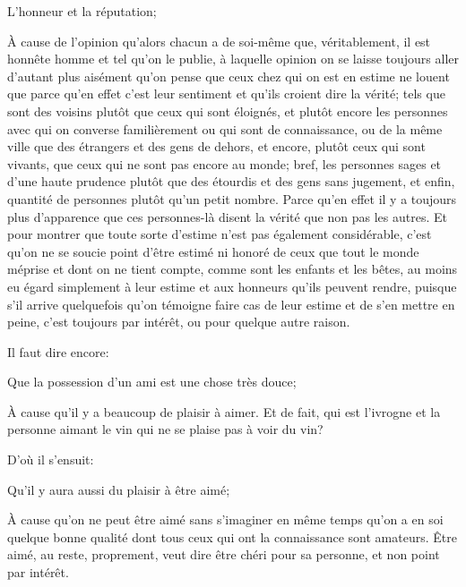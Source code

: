 \begin{lieu}
	L'honneur et la réputation;
\end{lieu}

À cause de l'opinion qu'alors chacun a de soi-même que, véritablement, il est honnête homme et tel qu'on le
publie, à laquelle opinion on se laisse toujours aller d'autant plus aisément qu'on pense que ceux chez qui
on est en estime ne louent que parce qu'en effet c'est leur sentiment et qu'ils croient dire la vérité; tels
que sont des voisins plutôt que ceux qui sont éloignés, et plutôt encore les personnes avec qui on converse
familièrement ou qui sont de connaissance, ou de la même ville que des étrangers et des gens de dehors, et
encore, plutôt ceux qui sont vivants, que ceux qui ne sont pas encore au monde; bref, les personnes sages et
d'une haute prudence plutôt que des étourdis et des gens sans jugement, et enfin, quantité de personnes
plutôt qu'un petit nombre. Parce qu'en effet il y a toujours plus d'apparence que ces personnes-là disent la
vérité que non pas les autres. Et pour montrer que toute sorte d'estime n'est pas également considérable, c'est
qu'on ne se soucie point d'être estimé ni honoré de ceux que tout le monde méprise et dont on ne tient compte,
comme sont les enfants et les bêtes, au moins eu égard simplement à leur estime et aux honneurs qu'ils peuvent
rendre, puisque s'il arrive quelquefois qu'on témoigne faire cas de leur estime et de s'en mettre en peine,
c'est toujours par intérêt, ou pour quelque autre raison.

\bigbreak

Il faut dire encore:

\begin{lieu}
	Que la possession d'un ami est une chose très douce;
\end{lieu}

À cause qu'il y a beaucoup de plaisir à aimer. Et de fait, qui est l'ivrogne et la personne aimant le vin qui
ne se plaise pas à voir du vin?

D'où il s'ensuit:

\begin{lieu}
	Qu'il y aura aussi du plaisir à être aimé;
\end{lieu}

À cause qu'on ne peut être aimé sans s'imaginer en même temps qu'on a en soi quelque bonne qualité dont tous
ceux qui ont la connaissance sont amateurs. Être aimé, au reste, proprement, veut dire être chéri pour sa
personne, et non point par intérêt.

